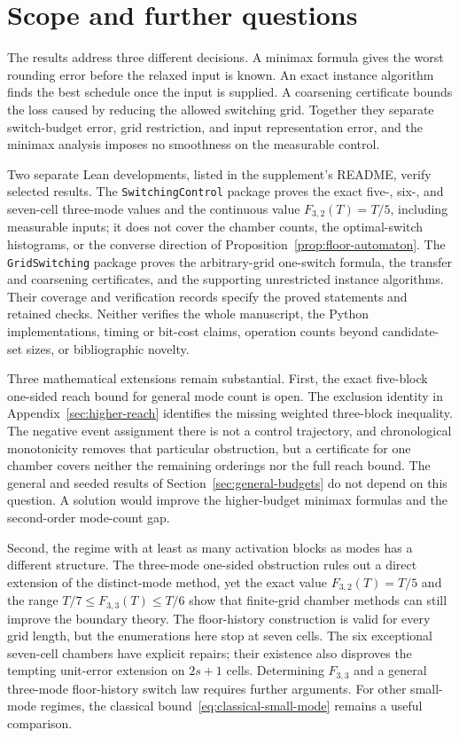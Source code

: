\section{Scope and further questions}\label{sec:discussion}

The results address three different decisions. A minimax formula gives the
worst rounding error before the relaxed input is known. An exact instance
algorithm finds the best schedule once the input is supplied. A coarsening
certificate bounds the loss caused by reducing the allowed switching grid.
Together they separate switch-budget error, grid restriction, and input
representation error, and the minimax analysis imposes no smoothness on the
measurable control.

Two separate Lean developments, listed in the supplement's README, verify
selected results. The \texttt{SwitchingControl} package proves the exact
five-, six-, and seven-cell three-mode values and the continuous value
$F_{3,2}(T)=T/5$, including measurable inputs; it does not cover the chamber
counts, the optimal-switch histograms, or the converse direction of
Proposition~\ref{prop:floor-automaton}. The \texttt{GridSwitching} package
proves the arbitrary-grid one-switch formula, the transfer and coarsening
certificates, and the supporting unrestricted instance algorithms. Their
coverage and verification records specify the proved statements and retained
checks. Neither verifies the whole manuscript, the Python implementations,
timing or bit-cost claims, operation counts beyond candidate-set sizes, or
bibliographic novelty.

Three mathematical extensions remain substantial. First, the exact
five-block one-sided reach bound for general mode count is open. The
exclusion identity in Appendix~\ref{sec:higher-reach} identifies the missing
weighted three-block inequality. The negative event assignment there is not a
control trajectory, and chronological monotonicity removes that particular
obstruction, but a certificate for one chamber covers neither the remaining
orderings nor the full reach bound. The general and seeded results of
Section~\ref{sec:general-budgets} do not depend on this question. A solution
would improve the higher-budget minimax formulas and the second-order
mode-count gap.

Second, the regime with at least as many activation blocks as modes has a
different structure. The three-mode one-sided obstruction rules out a direct
extension of the distinct-mode method, yet the exact value $F_{3,2}(T)=T/5$
and the range $T/7\le F_{3,3}(T)\le T/6$ show that finite-grid chamber methods
can still improve the boundary theory. The floor-history construction is
valid for every grid length, but the enumerations here stop at seven cells.
The six exceptional seven-cell chambers have explicit repairs; their existence
also disproves the tempting unit-error extension on $2s+1$ cells. Determining
$F_{3,3}$ and a general three-mode floor-history switch law requires further
arguments. For other small-mode regimes, the classical
bound~\eqref{eq:classical-small-mode} remains a useful comparison.

